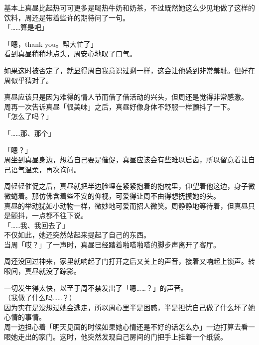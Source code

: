 基本上真昼比起热可可更多是喝热牛奶和奶茶，不过既然她这么少见地做了这样的饮料，周还是带着些许的期待问了一句。\\

「……算是吧」

「嗯，thank you。帮大忙了」\\

看到真昼稍稍地点头，周安心地叹了口气。

如果这时被否定了，就显得周自我意识过剩一样，这会让他感到非常羞耻。但好在周似乎猜对了。

真昼应该只是因为难得的情人节而借了借活动的兴头，但周还是觉得非常感激。\\

周再一次告诉真昼「很美味」之后，真昼好像身体不舒服一样颤抖了一下。\\

「怎么了吗？」

「……那、那个」

「嗯？」\\

周坐到真昼身边，想着自己要是催促，真昼应该会有些难以启齿，所以留意着让自己语气温柔，再次询问。

周轻轻催促之后，真昼就把半边脸埋在紧紧抱着的抱枕里，仰望着他这边，身子微微蜷着。那仿佛含着些不安的仰视，可爱得让周不由得想抚摸她的头。\\

真昼的举动犹如小动物一样，微妙地可爱而招人微笑。周静静地等待着，但真昼只是颤抖，一点都不往下说。\\

「……我、我回去了」\\

不仅如此，她还突然站起来提起了自己的东西。\\

当周「哎？」了一声时，真昼已经踏着啪嗒啪嗒的脚步声离开了客厅。

周还没回过神来，家里就响起了门打开之后又关上的声音，接着又响起上锁声。转眼间，真昼就没了踪影。

一切发生得太快，以至于周不禁发出了「嗯……？」的声音。\\

（我做了什么吗……？）\\

因为实在是没想过她会逃走，所以周心里半是困惑，半是担忧自己做了什么坏了她心情的事情。\\

周一边担心着「明天见面的时候如果她心情还是不好的话怎么办」一边打算去看一眼她走出的家门。这时，他突然发现自己房间的门把手上挂着一个纸袋。

